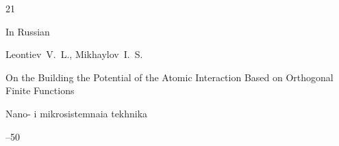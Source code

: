 \begin{thebibliography}{21}




\lang In Russian

\by Leontiev~V.~L., Mikhaylov~I.~S. 

\paper On the Building the Potential of the Atomic Interaction Based on Orthogonal Finite Functions

\jour Nano- i mikrosistemnaia tekhnika 



--50



\end{thebibliography}



\EngDate



\renewcommand{\baselinestretch}{0.9}



\Russian



\newpage



%

